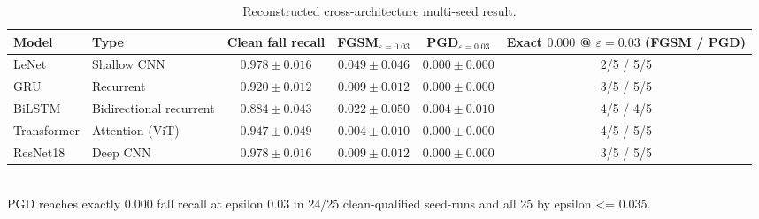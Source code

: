 \begin{table}[t]
  \centering
  \caption{Reconstructed cross-architecture multi-seed result.}
  \label{tab:cross-arch-multiseed-reconstructed}
  \begin{tabular}{l l c c c c}
    \toprule
    Model & Type & Clean fall recall & FGSM$_{\varepsilon{=}0.03}$ & PGD$_{\varepsilon{=}0.03}$ & Exact $0.000$ @ $\varepsilon{=}0.03$ (FGSM / PGD) \\
    \midrule
    LeNet & Shallow CNN & $0.978 \pm 0.016$ & $0.049 \pm 0.046$ & $\mathbf{0.000 \pm 0.000}$ & 2/5 / 5/5 \\
    GRU & Recurrent & $0.920 \pm 0.012$ & $0.009 \pm 0.012$ & $\mathbf{0.000 \pm 0.000}$ & 3/5 / 5/5 \\
    BiLSTM & Bidirectional recurrent & $0.884 \pm 0.043$ & $0.022 \pm 0.050$ & $0.004 \pm 0.010$ & 4/5 / 4/5 \\
    Transformer & Attention (ViT) & $0.947 \pm 0.049$ & $0.004 \pm 0.010$ & $\mathbf{0.000 \pm 0.000}$ & 4/5 / 5/5 \\
    ResNet18 & Deep CNN & $0.978 \pm 0.016$ & $0.009 \pm 0.012$ & $\mathbf{0.000 \pm 0.000}$ & 3/5 / 5/5 \\
    \bottomrule
  \end{tabular}
  \\[0.3em]{\footnotesize PGD reaches exactly 0.000 fall recall at epsilon 0.03 in 24/25 clean-qualified seed-runs and all 25 by epsilon <= 0.035.}
\end{table}
